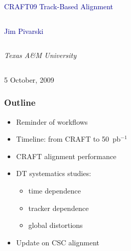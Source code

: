 \documentclass[compress]{beamer}
\begin{document}
\begin{frame}
\vfill
\begin{center}
\textcolor{darkblue}{\Large CRAFT09 Track-Based Alignment}

\vfill
\begin{columns}
\begin{center}
\large
\textcolor{darkblue}{Jim Pivarski}
\end{center}
\end{columns}

\begin{columns}
\begin{center}
\scriptsize
{\it Texas A\&M University}
\end{center}
\end{columns}

\vfill
 5 October, 2009

\end{center}
\end{frame}


\small

\begin{frame}
\frametitle{Outline}
\begin{itemize}\setlength{\itemsep}{0.5 cm}
\item Reminder of workflows
\item Timeline: from CRAFT to 50~pb$^{-1}$
\item CRAFT alignment performance
\item DT systematics studies:
\begin{itemize}
\item time dependence
\item tracker dependence
\item global distortions
\end{itemize}
\item Update on CSC alignment
\end{itemize}
\end{frame}
\end{document}
